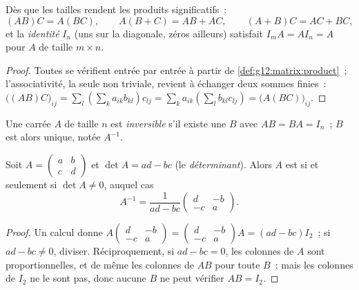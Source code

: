 \begin{proposition}\label{prop:g12:matrix:rules}
Dès que les tailles rendent les produits significatifs~:
\[
(AB)C = A(BC), \qquad A(B + C) = AB + AC, \qquad (A+B)C = AC + BC,
\]
et la \emph{ identité} $I_n$ (uns sur la diagonale, zéros ailleurs)
satisfait $I_m A = A I_n = A$ pour $A$ de taille $m \times n$.
\end{proposition}

\begin{proof}
Toutes se vérifient entrée par entrée à partir de
\cref{def:g12:matrix:product}~; l'associativité, la seule non triviale,
revient à échanger deux sommes finies~:
$\bigl((AB)C\bigr)_{ij} = \sum_l \left(\sum_k a_{ik}b_{kl}\right) c_{lj}
= \sum_k a_{ik} \left(\sum_l b_{kl} c_{lj}\right)
= \bigl(A(BC)\bigr)_{ij}$.
\end{proof}

\begin{definition}[Inverse]\label{def:g12:matrix:inverse}
Une  carrée $A$ de taille $n$ est \emph{inversible}
s'il existe une  $B$ avec $AB = BA = I_n$~; $B$ est alors unique,
notée $A^{-1}$.
\end{definition}

\begin{proposition}\label{prop:g12:matrix:inverse2x2}
Soit $A = \begin{pmatrix} a & b\\ c & d\end{pmatrix}$ et
$\det A = ad - bc$ (le \emph{déterminant}). Alors $A$ est
 si et seulement si $\det A \neq 0$, auquel cas
\[
A^{-1} = \frac{1}{ad - bc}\begin{pmatrix} d & -b\\ -c & a\end{pmatrix}.
\]
\end{proposition}

\begin{proof}
Un calcul donne
$A \begin{pmatrix} d & -b\\ -c & a\end{pmatrix}
= \begin{pmatrix} d & -b\\ -c & a\end{pmatrix} A = (ad - bc) I_2$~; si
$ad - bc \neq 0$, diviser. Réciproquement, si $ad - bc = 0$, les colonnes de
$A$ sont proportionnelles, et de même les colonnes de $AB$ pour toute $B$~;
mais les colonnes de $I_2$ ne le sont pas, donc aucune $B$ ne peut vérifier
$AB = I_2$.
\end{proof}

